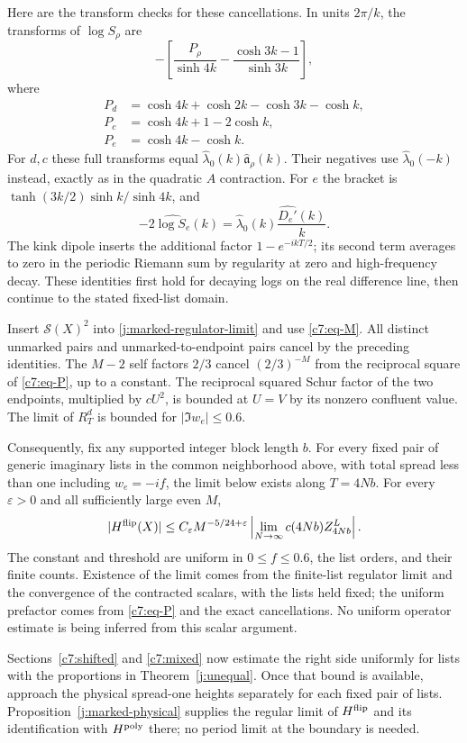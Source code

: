Here are the transform checks for these cancellations. In units
$2\pi/k$, the transforms of $\log S_\rho$ are
\[
 -\left[\frac{P_\rho}{\sinh4k}
      -\frac{\cosh3k-1}{\sinh3k}\right],
\]
where
\[
\begin{aligned}
 P_d&=\cosh4k+\cosh2k-\cosh3k-\cosh k,\\
 P_c&=\cosh4k+1-2\cosh k,\\
 P_e&=\cosh4k-\cosh k.
\end{aligned}
\]
For $d,c$ these full transforms equal
$\widehat\lambda_0(k)\widehat{\mathfrak a}_\rho(k)$.
Their negatives use $\widehat\lambda_0(-k)$ instead, exactly
as in the quadratic $A$ contraction. For $e$ the bracket is
$\tanh(3k/2)\sinh k/\sinh4k$, and
\[
 -2\widehat{\log S_e}(k)
 =\widehat\lambda_0(k)\frac{\widehat{D_e'}(k)}{k}.
\]
The kink dipole inserts the additional factor
$1-e^{-ikT/2}$; its second term averages to zero in the
periodic Riemann sum by regularity at zero and high-frequency
decay. These identities first hold for decaying logs on the real
difference line, then continue to the stated fixed-list domain.

Insert $\mathcal S(X)^2$ into
\eqref{j:marked-regulator-limit} and use \eqref{c7:eq-M}.
All distinct unmarked pairs and unmarked-to-endpoint pairs cancel
by the preceding identities. The $M-2$ self factors $2/3$
cancel $(2/3)^{-M}$ from the reciprocal square of
\eqref{c7:eq-P}, up to a constant. The reciprocal squared
Schur factor of the two endpoints, multiplied by $cU^2$, is
bounded at $U=V$ by its nonzero confluent value. The limit of
$R_T^d$ is bounded for $|\Im w_e|\le0.6$.

Consequently, fix any supported integer block length $b$. For
every fixed pair of generic imaginary lists in the common
neighborhood above, with total spread less than one including
$w_e=-if$, the limit below exists along $T=4Nb$. For every
$\varepsilon>0$ and all sufficiently large even $M$,
\begin{equation}\label{c7:eq-Z}
 |H^{\rm flip}(X)|
 \le C_\varepsilon M^{-5/24+\varepsilon}
       \left|\lim_{N\to\infty}c(4Nb)Z_{4Nb}^L\right|.
\end{equation}
The constant and threshold are uniform in $0\le f\le0.6$, the
list orders, and their finite counts. Existence of the limit
comes from the finite-list regulator limit and the convergence
of the contracted scalars, with the lists held fixed; the
uniform prefactor comes from \eqref{c7:eq-P} and the exact
cancellations. No uniform operator estimate is being inferred
from this scalar argument.

Sections~\ref{c7:shifted} and \ref{c7:mixed} now estimate the
right side uniformly for lists with the proportions in
Theorem~\ref{j:unequal}. Once that bound is available, approach
the physical spread-one heights separately for each fixed pair
of lists. Proposition~\ref{j:marked-physical} supplies the
regular limit of $H^{\rm flip}$ and its identification with
$H^{\rm poly}$ there; no period limit at the boundary is needed.
